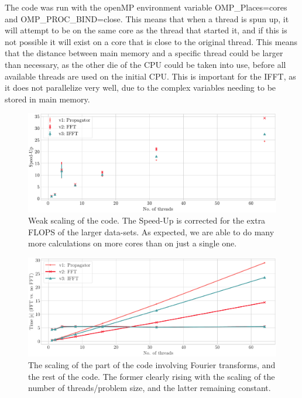 \documentclass{article}
\begin{document}
The code was run with the openMP environment variable OMP\_Places=cores and OMP\_PROC\_BIND=close. This means that when a thread is spun up, it will attempt to be on the same core as the thread that started it, and if this is not possible it will exist on a core that is close to the original thread. This means that the distance between main memory and a specific thread could be larger than necessary, as the other die of the CPU could be taken into use, before all available threads are used on the initial CPU. This is important for the IFFT, as it does not parallelize very well, due to the complex variables needing to be stored in main memory. 
\begin{figure}
    \centering
    \includegraphics[width=\textwidth]{./figures/weak_scaling_corrected.pdf}
    \caption{Weak scaling of the code. The Speed-Up is corrected for the extra FLOPS of the larger data-sets. As expected, we are able to do many more calculations on more cores than on just a single one.}
    \label{fig:weak}
\end{figure}

\begin{figure}
    \centering
    \includegraphics[width=\textwidth]{./figures/FFT_scaling.pdf}
    \caption{The scaling of the part of the code involving Fourier transforms, and the rest of the code. The former clearly rising with the scaling of the number of threads/problem size, and the latter remaining constant.}
    \label{fig:fft_scaling}
\end{figure}
\FloatBarrier
\appendix
\end{document}
